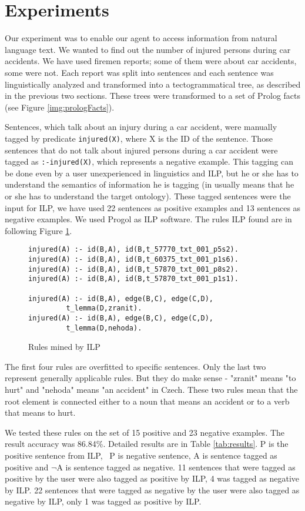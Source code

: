 \documentclass{sig-alternate}
\begin{document}
\section{Experiments}
Our experiment was to enable our agent to access information from natural language text. We wanted to find out the number of injured persons during car accidents. We have used firemen reports; some of them were about car accidents, some were not. Each report was split into sentences and each sentence was linguistically analyzed and transformed into a tectogrammatical tree, as described in the previous two sections. These trees were transformed to a set of Prolog facts (see Figure \ref{img:prologFacts}). \par
Sentences, which talk about an injury during a car accident, were manually tagged by predicate \verb#injured(X)#, where X is the ID of the sentence. Those sentences that do not talk about injured persons during a car accident were tagged as \verb#:-injured(X)#, which represents a negative example. This tagging can be done even by a user unexperienced in linguistics and ILP, but he or she has to understand the semantics of information he is tagging (in usually means that he or she has to understand the target ontology).
These tagged sentences were the input for ILP, we have used 22 sentences as positive examples and 13 sentences as negative examples. We used Progol \cite{biblio:Muggleton2} as ILP software.
The rules ILP found are in following Figure \ref{img:rules}.

\begin{figure}
{\footnotesize
\begin{verbatim}
injured(A) :- id(B,A), id(B,t_57770_txt_001_p5s2).
injured(A) :- id(B,A), id(B,t_60375_txt_001_p1s6).
injured(A) :- id(B,A), id(B,t_57870_txt_001_p8s2).
injured(A) :- id(B,A), id(B,t_57870_txt_001_p1s1).

injured(A) :- id(B,A), edge(B,C), edge(C,D), 
         t_lemma(D,zranit).         
injured(A) :- id(B,A), edge(B,C), edge(C,D), 
         t_lemma(D,nehoda).\end{verbatim}}\caption{Rules mined by ILP }\label{img:rules}
\end{figure}

The first four rules are overfitted to specific sentences. Only the last two represent generally applicable rules. But they do make sense - "zranit" means "to hurt" and "nehoda" means "an accident" in Czech. These two rules mean that the root element is connected either to a noun that means an accident or to a verb that means to hurt.\par
We tested these rules on the set of 15 positive and 23 negative examples. The result accuracy was 86.84\%. Detailed results are in Table \ref{tab:results}. P is the positive sentence from ILP, ~P is negative sentence, A is sentence tagged as positive and $\neg$A is sentence tagged as negative. 11 sentences that were tagged as positive by the user were also tagged as positive by ILP, 4 was tagged as negative by ILP. 22 sentences that were tagged as negative by the user were also tagged as negative by ILP, only 1 was tagged as positive by ILP.
\end{document}
